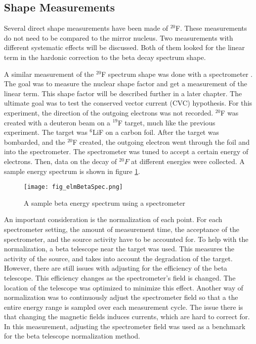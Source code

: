 \documentclass[main.tex]{subfiles}
\begin{document}
\subsection{Shape Measurements} 

Several direct shape measurements have been made of $^{20}$F.
These measurements do not need to be compared to the mirror nucleus.
Two measurements with different systematic effects will be discussed.
Both of them looked for the linear term in the hardonic correction to the beta decay spectrum shape. 

A similar measurement of the $^{20}$F spectrum shape was done with a spectrometer \cite{Elm87}.
The goal was to measure the nuclear shape factor and get a measurement of the linear term.
This shape factor will be described further in a later chapter.
The ultimate goal was to test the conserved vector current (CVC) hypothesis. 
For this experiment, the direction of the outgoing electrons was not recorded.
$^{20}$F was created with a deuteron beam on a $^{19}$F target, much like the previous experiment.
The target was $^{6}$LiF on a carbon foil.
After the target was bombarded, and the $^{20}$F created, the outgoing electron went through the foil and into the spectrometer.
The spectrometer was tuned to accept a certain energy of electrons. 
Then, data on the decay of $^{20}F$ at different energies were collected.
A sample energy spectrum is shown in figure \ref{fig:elmspec}.

\begin{figure}[!htb]
	\centerline{\texttt{[image: fig\_elmBetaSpec.png]}}
	\caption{A sample beta energy spectrum using a spectrometer \cite{Elm87}}
	\label{fig:elmspec}
\end{figure}


An important consideration is the normalization of each point.
For each spectrometer setting, the amount of measurement time, the acceptance of the spectrometer, and the source activity have to be accounted for.
To help with the normalization, a beta telescope near the target was used.
This measures the activity of the source, and takes into account the degradation of the target.
However, there are still issues with adjusting for the efficiency of the beta telescope.
This efficiency changes as the spectrometer's field is changed.
The location of the telescope was optimized to minimize this effect.
Another way of normalization was to continuously adjust the spectrometer field so that a the entire energy range is sampled over each measurement cycle.
The issue there is that changing the magnetic fields induces currents, which are hard to correct for. 
In this measurement, adjusting the spectrometer field was used as a benchmark for the beta telescope normalization method.
\end{document}
